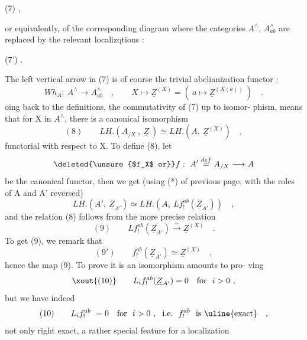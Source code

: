 
(7) \hfill ,

or equivalently,  of the corresponding diagram  where the categories
$A^{\wedge}$, $A^{\wedge}_{ab}$  are replaced by the relevant localizqtions :

(7') \hfill .

The left vertical arrow in (7)  is of course the trivial abelianization
functor  :
\[ Wh_A :\ A^{\wedge} \longrightarrow A^{\wedge}_{ab} \quad , \qquad X \longmapsto \underline{Z}^{(X)} = (\ a \mapsto \underline{Z}^{(X(a))}\ ) \quad . \]
oing back to the definitions,  the commutativity of (7) up to isomor-%
phism,  means that for X in $A^{\wedge}$,  there is a canonical isomorphism
\[ (8) \qquad LH.(A_{/X}\ ,\ \underline{Z}\ ) \simeq LH.(A,\ \underline{Z}^{(X)}) \quad , \]
functorial with respect to X.   To define (8),  let
\[ \deleted{\unsure{$f_X$ or}}f :\ A' \overset{def}{=} A_{/X} \longrightarrow A \]
be the canonical functor,  then we get (using (*) of previous page,
with the roles of A and A' reversed)
\[ LH.(A',\ \underline{Z}_{A'}) \simeq LH.(A,\ Lf^{ab}_{!}(\underline{Z}_{A'})) \quad , \]
and the relation (8) follows from the more precise relation
\[ (9) \qquad Lf^{ab}_{!}(\underline{Z}_{A'}) \xrightarrow{\sim} \underline{Z}^{(X)} \quad . \]
To get  (9),  we remark that  
\[ (9') \qquad f^{ab}_{!}(\underline{Z}_{A'}) \simeq \underline{Z}^{(X)} \quad , \]
hence the  map (9).  To prove it is an isomorphism amounts to pro-%
ving
\[ \xout{(10)} \qquad L_i f^{ab}_{!}(\underline{Z}_{A'}) = 0 \quad \text{for} \ \ i > 0 \ , \]
but we have indeed
\[ (10) \qquad L_i f^{ab}_{!} \ = 0 \quad \text{for} \ \ i > 0 \ , \ \ \text{i.e.} \ \ f^{ab}_{!} \ \ \text{is \uline{exact}} \quad , \]
not only right exact,  a rather special feature\hand{,}  for a localization

